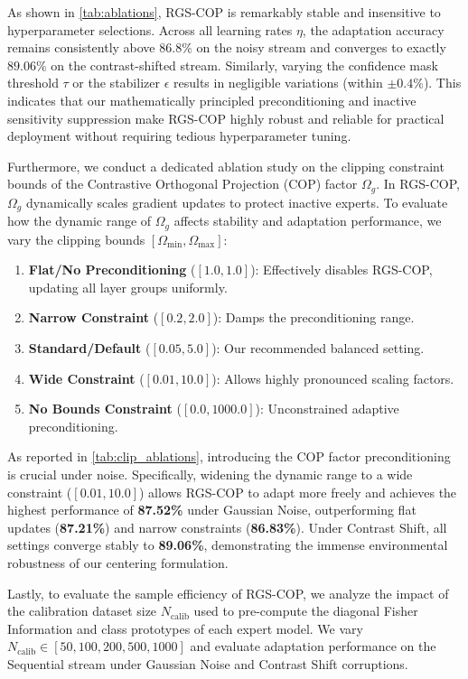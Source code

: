 \documentclass{article}
\theoremstyle{plain}
\theoremstyle{definition}
\theoremstyle{remark}
\begin{document}
As shown in \cref{tab:ablations}, RGS-COP is remarkably stable and insensitive to hyperparameter selections. Across all learning rates $\eta$, the adaptation accuracy remains consistently above $86.8\%$ on the noisy stream and converges to exactly $89.06\%$ on the contrast-shifted stream. Similarly, varying the confidence mask threshold $\tau$ or the stabilizer $\epsilon$ results in negligible variations (within $\pm 0.4\%$). This indicates that our mathematically principled preconditioning and inactive sensitivity suppression make RGS-COP highly robust and reliable for practical deployment without requiring tedious hyperparameter tuning.

Furthermore, we conduct a dedicated ablation study on the clipping constraint bounds of the Contrastive Orthogonal Projection (COP) factor $\Omega_g$. In RGS-COP, $\Omega_g$ dynamically scales gradient updates to protect inactive experts. To evaluate how the dynamic range of $\Omega_g$ affects stability and adaptation performance, we vary the clipping bounds $[\Omega_{\min}, \Omega_{\max}]$:
\begin{enumerate}
    \item \textbf{Flat/No Preconditioning} ($[1.0, 1.0]$): Effectively disables RGS-COP, updating all layer groups uniformly.
    \item \textbf{Narrow Constraint} ($[0.2, 2.0]$): Damps the preconditioning range.
    \item \textbf{Standard/Default} ($[0.05, 5.0]$): Our recommended balanced setting.
    \item \textbf{Wide Constraint} ($[0.01, 10.0]$): Allows highly pronounced scaling factors.
    \item \textbf{No Bounds Constraint} ($[0.0, 1000.0]$): Unconstrained adaptive preconditioning.
\end{enumerate}

As reported in \cref{tab:clip_ablations}, introducing the COP factor preconditioning is crucial under noise. Specifically, widening the dynamic range to a wide constraint ($[0.01, 10.0]$) allows RGS-COP to adapt more freely and achieves the highest performance of \textbf{87.52\%} under Gaussian Noise, outperforming flat updates (\textbf{87.21\%}) and narrow constraints (\textbf{86.83\%}). Under Contrast Shift, all settings converge stably to \textbf{89.06\%}, demonstrating the immense environmental robustness of our centering formulation.

Lastly, to evaluate the sample efficiency of RGS-COP, we analyze the impact of the calibration dataset size $N_{\text{calib}}$ used to pre-compute the diagonal Fisher Information and class prototypes of each expert model. We vary $N_{\text{calib}} \in [50, 100, 200, 500, 1000]$ and evaluate adaptation performance on the Sequential stream under Gaussian Noise and Contrast Shift corruptions.
\end{document}
